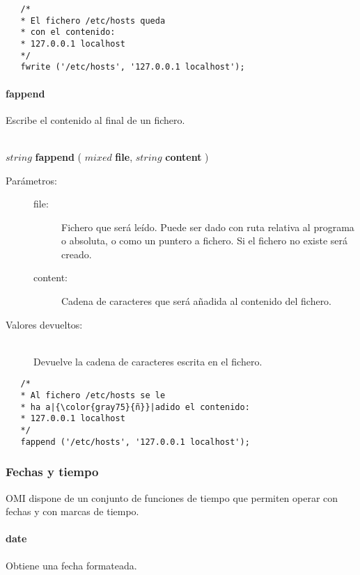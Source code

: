 \begin{lstlisting}  
   /*
   * El fichero /etc/hosts queda
   * con el contenido:
   * 127.0.0.1 localhost
   */
   fwrite ('/etc/hosts', '127.0.0.1 localhost');
\end{lstlisting}

\paragraph{fappend}
Escribe el contenido al final de un fichero.

\begin{framed}
\hfill \\ $string$ \textbf{fappend} ( $mixed$ \textbf{file}, $string$ \textbf{content}  )  
\begin{description}
\item [Parámetros:] \hfill 
   \begin{description}
   \item[file:] Fichero que será leído. Puede ser dado con ruta relativa al programa o absoluta, o como un puntero a fichero. 
   Si el fichero no existe será creado.
   \item[content:] Cadena de caracteres que será añadida al contenido del fichero.
   \end{description}
\item[Valores devueltos:] \hfill \\
   Devuelve la cadena de caracteres escrita en el fichero.
\end{description}
\end{framed}

\begin{lstlisting}  
   /*
   * Al fichero /etc/hosts se le
   * ha a|{\color{gray75}{ñ}}|adido el contenido:
   * 127.0.0.1 localhost
   */
   fappend ('/etc/hosts', '127.0.0.1 localhost');
\end{lstlisting}

\subsubsection{Fechas y tiempo}
OMI dispone de un conjunto de funciones de tiempo que permiten operar con fechas y con marcas de tiempo. 

\paragraph{date}
Obtiene una fecha formateada.  

